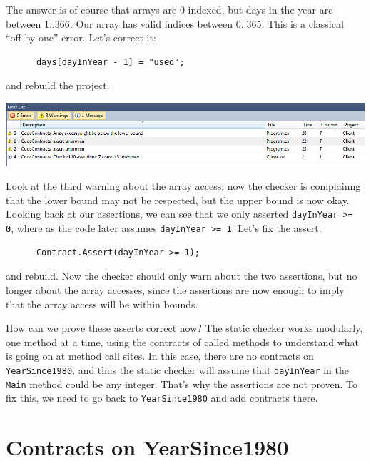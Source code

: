 \documentclass{article}
\newcommand{\code}[1]{\lstinline{#1}}
\begin{document}
The answer is of course that arrays are 0 indexed, but days in the
year are between 1..366. Our array has valid indices between 0..365.
This is a classical ``off-by-one'' error. Let's correct it:
\begin{lstlisting}
      days[dayInYear - 1] = "used";
\end{lstlisting}
and rebuild the project.
\begin{center}
  \includegraphics[width=1\columnwidth]{errors5.png}
\end{center}
Look at the third warning about the array access: now the checker is
complainng that the lower bound may not be respected, but the upper
bound is now okay. Looking back at our assertions, we can see that we
only asserted \code{dayInYear >= 0}, where as the code later assumes
\code{dayInYear >= 1}. Let's fix the assert.
\begin{lstlisting}
      Contract.Assert(dayInYear >= 1);
\end{lstlisting}
and rebuild. Now the checker should only warn about the two assertions,
but no longer about the array accesses, since the assertions are now
enough to imply that the array access will be within bounds.

How can we prove these asserts correct now? The static checker works
modularly, one method at a time, using the contracts of called methods
to understand what is going on at method call sites. In this case,
there are no contracts on \code{YearSince1980}, and thus the static
checker will assume that \code{dayInYear} in the \code{Main} method
could be any integer. That's why the assertions are not proven. To fix
this, we need to go back to \code{YearSince1980} and add
contracts there.

\section{Contracts on YearSince1980}
\end{document}
